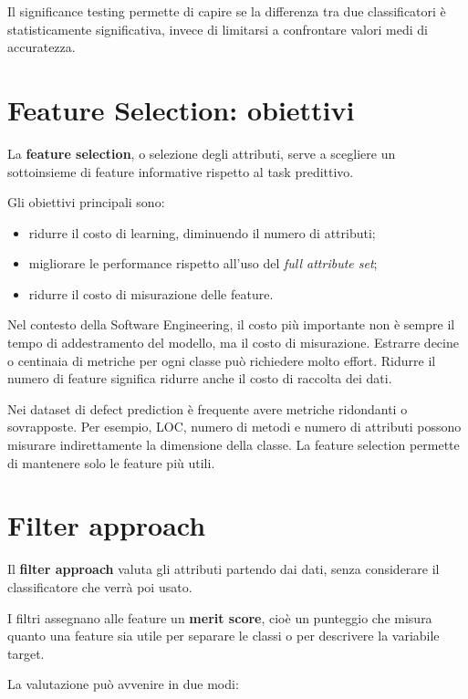 Il significance testing permette di capire se la differenza tra due classificatori è statisticamente significativa, invece di limitarsi a confrontare valori medi di accuratezza.

\section{Feature Selection: obiettivi}

La \textbf{feature selection}, o selezione degli attributi, serve a scegliere un sottoinsieme di feature informative rispetto al task predittivo.

Gli obiettivi principali sono:

\begin{itemize}
    \item ridurre il costo di learning, diminuendo il numero di attributi;
    \item migliorare le performance rispetto all'uso del \emph{full attribute set};
    \item ridurre il costo di misurazione delle feature.
\end{itemize}

\begin{notaesame}
Nel contesto della Software Engineering, il costo più importante non è sempre il tempo di addestramento del modello, ma il costo di misurazione. Estrarre decine o centinaia di metriche per ogni classe può richiedere molto effort. Ridurre il numero di feature significa ridurre anche il costo di raccolta dei dati.
\end{notaesame}

Nei dataset di defect prediction è frequente avere metriche ridondanti o sovrapposte. Per esempio, LOC, numero di metodi e numero di attributi possono misurare indirettamente la dimensione della classe. La feature selection permette di mantenere solo le feature più utili.

\section{Filter approach}

Il \textbf{filter approach} valuta gli attributi partendo dai dati, senza considerare il classificatore che verrà poi usato.

I filtri assegnano alle feature un \textbf{merit score}, cioè un punteggio che misura quanto una feature sia utile per separare le classi o per descrivere la variabile target.

La valutazione può avvenire in due modi:

